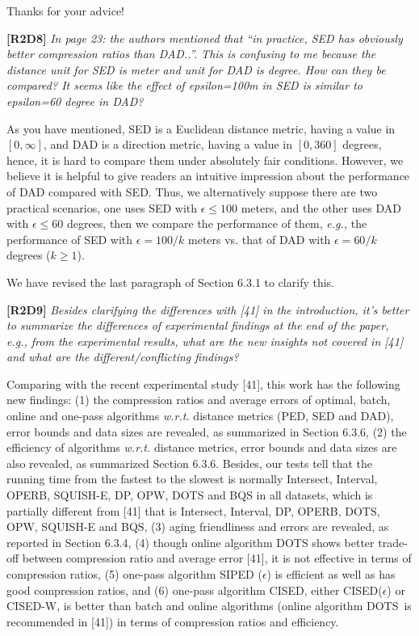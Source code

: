 \documentclass{letter}
\newcommand{\eg}{\emph{e.g.,}\xspace}
\newcommand{\wrt}{\emph{w.r.t.}\xspace}
\begin{document}
{{Thanks for your advice!


\textbf{[R2D8]} \emph{In page 23: the authors mentioned that “in practice, SED has obviously better compression ratios than DAD..”. This is confusing to me because the distance unit for SED is meter and unit for DAD is degree. How can they be compared? It seems like the effect of epsilon=100m in SED is similar to epsilon=60 degree in DAD?}

As you have mentioned, SED is a Euclidean distance metric, having a value in $[0, \infty]$, and DAD is a direction metric, having a value in $[0, 360]$ degrees, hence, it is hard to compare them under absolutely fair conditions. However, we believe it is helpful to give readers an intuitive impression about the performance of DAD compared with SED. Thus, we alternatively suppose there are two practical scenarios, one uses SED with $\epsilon  \le  100$ meters, and the other uses DAD with $\epsilon \le 60$ degrees, then we compare the performance of them, \eg the performance of SED with $\epsilon=100/k$ meters vs. that of DAD with $\epsilon=60/k$ degrees ($k\ge 1$). 


{We have revised the last paragraph of Section 6.3.1 to clarify this. }

\textbf{[R2D9]} \emph{Besides clarifying the differences with [41] in the introduction, it’s better to summarize the differences of experimental findings at the end of the paper, e.g., from the experimental results, what are the new insights not covered in [41] and what are the different/conflicting findings?}

Comparing with the recent experimental study [41], this work has the following new findings: 
(1) the compression ratios and average errors of optimal, batch, online and one-pass algorithms \wrt distance metrics (PED, SED and DAD), error bounds and data sizes are revealed, as summarized in Section 6.3.6, 
(2) the efficiency of algorithms \wrt distance metrics, error bounds and data sizes are also revealed, as summarized Section 6.3.6. Besides, our tests tell that the running time from the fastest to the slowest is normally Intersect, Interval, OPERB, SQUISH-E, DP, OPW, DOTS and BQS in all datasets, which is partially different from [41] that is Intersect, Interval, DP, OPERB, DOTS, OPW, SQUISH-E and BQS, 
(3) aging friendliness and errors are revealed, as reported in Section 6.3.4,
(4) though online algorithm DOTS shows better trade-off between compression ratio and average error [41], it is not effective in terms of compression ratios,  
(5) one-pass algorithm SIPED ($\epsilon$) is efficient as well as has good compression ratios, and 
(6) one-pass algorithm CISED, either CISED($\epsilon$) or CISED-W, is better than batch and online algorithms (online algorithm DOTS~is recommended in [41]) in terms of compression ratios and efficiency.

}}
\end{document}
